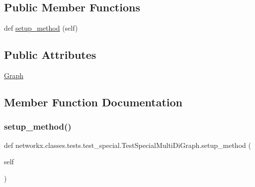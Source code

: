 \subsection*{Public Member Functions}
\begin{DoxyCompactItemize}
\item 
def \hyperlink{classnetworkx_1_1classes_1_1tests_1_1test__special_1_1TestSpecialMultiDiGraph_a92e6fec273c5754039e531618355bc95}{setup\+\_\+method} (self)
\end{DoxyCompactItemize}
\subsection*{Public Attributes}
\begin{DoxyCompactItemize}
\item 
\hyperlink{classnetworkx_1_1classes_1_1tests_1_1test__special_1_1TestSpecialMultiDiGraph_ab788e0322ea8550b5b3a671f1d15de89}{Graph}
\end{DoxyCompactItemize}


\subsection{Member Function Documentation}
\mbox{\label{classnetworkx_1_1classes_1_1tests_1_1test__special_1_1TestSpecialMultiDiGraph_a92e6fec273c5754039e531618355bc95}} 
\subsubsection{\texorpdfstring{setup\+\_\+method()}{setup\_method()}}
{\footnotesize\ttfamily def networkx.\+classes.\+tests.\+test\+\_\+special.\+Test\+Special\+Multi\+Di\+Graph.\+setup\+\_\+method (\begin{DoxyParamCaption}\item[{}]{self }\end{DoxyParamCaption})}



